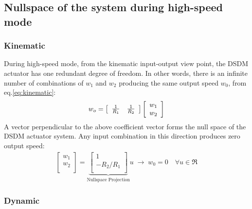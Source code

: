 \newpage
\subsection{Nullspace of the system during high-speed mode}

\subsubsection{Kinematic}

During high-speed mode, from the kinematic input-output view point, the DSDM actuator has one redundant degree of freedom. In other words, there is an infinite number of combinations of $w_1$ and $w_2$ producing the same output speed $w_0$, from eq.\eqref{eq:kinematic}:  
%
\begin{align}
w_o
 = 
\left[
\begin{array}{c c}
\frac{1}{R_1} & \frac{1}{R_2}
\end{array}
\right]
\left[
\begin{array}{c}
w_1 \\
w_2 \\
\end{array}
\right]
\end{align}
%
A vector perpendicular to the above coefficient vector forms the null space of the DSDM actuator system. Any input combination in this direction produces zero output speed:
%
\begin{align}
\left[
\begin{array}{c}
w_1 \\
w_2 \\
\end{array}
\right]=
\underbrace{\left[
\begin{array}{c}
1 \\
-R_2/R_1 \\
\end{array}
\right]}_{\text{Nullspace Projection}}
u  \; \rightarrow \;
w_0 = 0 \quad \forall u \in \Re
\label{eq:kinematicnullspace}
\end{align}
%

\subsubsection{Dynamic}

